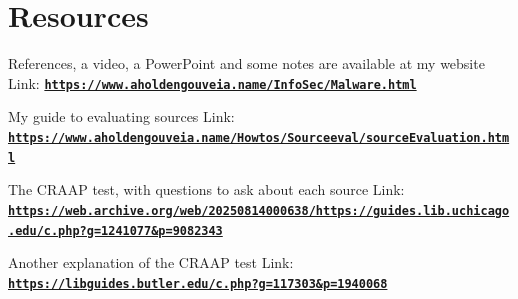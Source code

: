 \documentclass[12pt]{article}
\begin{document}
\section*{Resources}
References, a video, a PowerPoint and some notes are available at my website
Link: \href{https://www.aholdengouveia.name/InfoSec/Malware.html}{\textbf{\nolinkurl{https://www.aholdengouveia.name/InfoSec/Malware.html}}}

My guide to evaluating sources
Link: \href{https://www.aholdengouveia.name/Howtos/Sourceeval/sourceEvaluation.html}{\textbf{\nolinkurl{https://www.aholdengouveia.name/Howtos/Sourceeval/sourceEvaluation.html}}}

The CRAAP test, with questions to ask about each source
Link: \href{https://web.archive.org/web/20250814000638/https://guides.lib.uchicago.edu/c.php?g=1241077&p=9082343}{\textbf{\nolinkurl{https://web.archive.org/web/20250814000638/https://guides.lib.uchicago.edu/c.php?g=1241077&p=9082343}}}

Another explanation of the CRAAP test
Link: \href{https://libguides.butler.edu/c.php?g=117303&p=1940068}{\textbf{\nolinkurl{https://libguides.butler.edu/c.php?g=117303&p=1940068}}}
\end{document}
